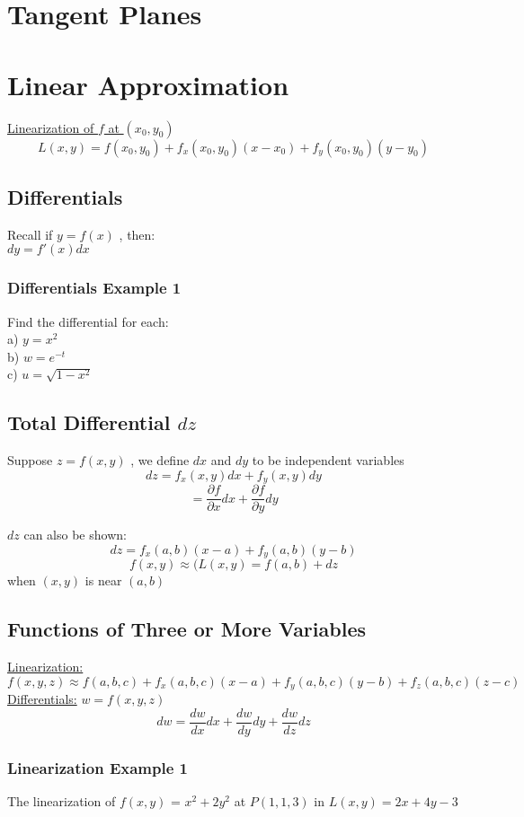 \documentclass[12pt]{article}
\begin{document}
\section{Tangent Planes}

\section{Linear Approximation}
\underline{Linearization of \(f\) at \((x_0,y_0)\) }
\[
	L(x,y) = f(x_0,y_0) + f_x(x_0,y_0)(x-x_0) + f_y(x_0,y_0)(y-y_0)
\]

\subsection{Differentials}
Recall if \(y=f(x)\) , then: \\
\(dy=f'(x)dx\) 

\subsubsection{Differentials Example 1}
Find the differential for each:\\
a) \(y=x^2\) \\
b) \(w=e^{-t}\) \\
c) \(u=\sqrt{1-x^2}\) 

\subsection{Total Differential \(dz\) }
Suppose \(z=f(x,y)\) , we define \(dx\) and \(dy\) to be independent variables\
\[
	dz = f_x(x,y)dx + f_y(x,y)dy
\]
\[
	=\frac{\partial f}{\partial x} dx + \frac{\partial f}{\partial y} dy
\]

\(dz\) can also be shown:
\[
	dz=f_x(a,b)(x-a) + f_y(a,b)(y-b)
\]
\[
	f(x,y) \approx (L(x,y) = f(a,b) + dz
\]
when \((x,y)\) is near \((a,b)\) 

\subsection{Functions of Three or More Variables}
\underline{Linearization:}
\[
	f(x,y,z) \approx f(a,b,c) + f_x(a,b,c)(x-a) + f_y(a,b,c)(y-b) + f_z(a,b,c)(z-c)
\]
\underline{Differentials:} \(w=f(x,y,z)\) 
\[
	dw=\frac{dw}{dx}dx + \frac{dw}{dy}dy + \frac{dw}{dz}dz
\]
\subsubsection{Linearization Example 1}
The linearization of \(f(x,y)\) = \(x^2+2y^2\) at \(P(1,1,3)\) in \(L(x,y) = 2x+4y-3\) 
\end{document}
